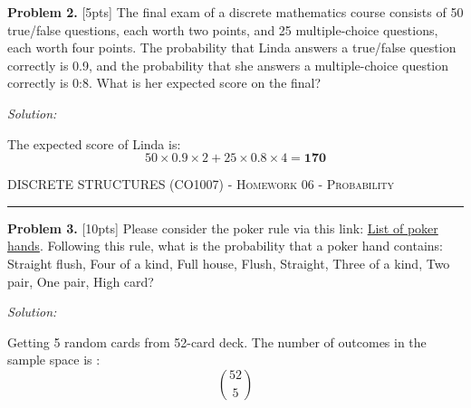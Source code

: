 \documentclass[12pt]{amsart}
\begin{document}
\textbf{Problem 2. }[5pts] The final exam of a discrete mathematics course consists of 50 true/false questions,
each worth two points, and 25 multiple-choice questions, each worth four points. The probability that Linda
answers a true/false question correctly is 0.9, and the probability that she answers a multiple-choice question
correctly is 0:8. What is her expected score on the final?

\bigskip
\textit{Solution:}

\medskip
The expected score of Linda is: 
$$50\times0.9\times2 + 25\times0.8\times4 = \mathbf{170}$$
\newpage

{\scshape } \hfill {\scshape DISCRETE STRUCTURES (CO1007) - Homework 06 - Probability} \hfill {\scshape }
 
\smallskip

\hrule

\bigskip

\bigskip 

\textbf{Problem 3. } [10pts] Please consider the poker rule via this link: \href{https://en.wikipedia.org/wiki/List_
of_poker_hands}{List of poker hands}. Following this rule, what is the probability that a poker hand contains: Straight flush,
Four of a kind, Full house, Flush, Straight, Three of a kind, Two pair, One pair, High card?

\bigskip
\textit{Solution:}

\medskip
Getting 5 random cards from 52-card deck. The number of outcomes in the sample space is :
\[\binom{52}{5}\]
\end{document}
